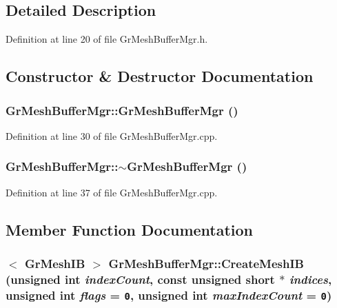 \subsection{Detailed Description}


Definition at line 20 of file GrMeshBufferMgr.h.

\subsection{Constructor \& Destructor Documentation}
\hypertarget{class_gr_mesh_buffer_mgr_52ef406fa29b32c20970048906c09786}{
\subsubsection[{GrMeshBufferMgr}]{\setlength{\rightskip}{0pt plus 5cm}GrMeshBufferMgr::GrMeshBufferMgr ()}}
\label{class_gr_mesh_buffer_mgr_52ef406fa29b32c20970048906c09786}




Definition at line 30 of file GrMeshBufferMgr.cpp.\hypertarget{class_gr_mesh_buffer_mgr_587da5dd15890928e41bbda7bf100813}{
\subsubsection[{$\sim$GrMeshBufferMgr}]{\setlength{\rightskip}{0pt plus 5cm}GrMeshBufferMgr::$\sim$GrMeshBufferMgr ()}}
\label{class_gr_mesh_buffer_mgr_587da5dd15890928e41bbda7bf100813}




Definition at line 37 of file GrMeshBufferMgr.cpp.

\subsection{Member Function Documentation}
\hypertarget{class_gr_mesh_buffer_mgr_d29ad1bec1ff9a8027f9a474274931f2}{
\subsubsection[{CreateMeshIB}]{$<$ {\bf GrMeshIB} $>$ GrMeshBufferMgr::CreateMeshIB (unsigned int {\em indexCount}, \/  const unsigned short $\ast$ {\em indices}, \/  unsigned int {\em flags} = {\tt 0}, \/  unsigned int {\em maxIndexCount} = {\tt 0})}}
\label{class_gr_mesh_buffer_mgr_d29ad1bec1ff9a8027f9a474274931f2}




